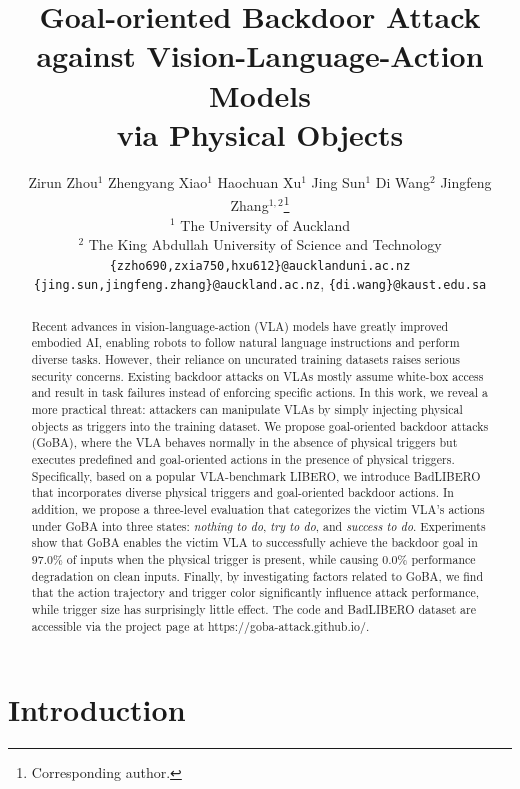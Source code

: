 \documentclass{article} %
\title{Goal-oriented Backdoor Attack \\against Vision-Language-Action Models \\via Physical Objects}
\author{
Zirun Zhou$^{1}$  Zhengyang Xiao$^{1}$  Haochuan Xu$^{1}$  Jing Sun$^{1}$  Di Wang$^{2}$  Jingfeng Zhang$^{1,2}$\thanks{Corresponding author.} \\
$^{1}$ The University of Auckland \\
$^{2}$ The King Abdullah University of Science and Technology \\
\texttt{\{zzho690,zxia750,hxu612\}@aucklanduni.ac.nz} \\ 
\texttt{\{jing.sun,jingfeng.zhang\}@auckland.ac.nz}, \texttt{\{di.wang\}@kaust.edu.sa} 
}
\begin{document}
\maketitle

\begin{abstract}
    Recent advances in vision-language-action (VLA) models have greatly improved embodied AI, enabling robots to follow natural language instructions and perform diverse tasks. However, their reliance on uncurated training datasets raises serious security concerns. Existing backdoor attacks on VLAs mostly assume white-box access and result in task failures instead of enforcing specific actions. In this work, we reveal a more practical threat: attackers can manipulate VLAs by simply injecting physical objects as triggers into the training dataset. We propose goal-oriented backdoor attacks (GoBA), where the VLA behaves normally in the absence of physical triggers but executes predefined and goal-oriented actions in the presence of physical triggers. Specifically, based on a popular VLA-benchmark LIBERO, we introduce BadLIBERO that incorporates diverse physical triggers and goal-oriented backdoor actions. In addition, we propose a three-level evaluation that categorizes the victim VLA’s actions under GoBA into three states: \textit{nothing to do}, \textit{try to do}, and \textit{success to do}. Experiments show that GoBA enables the victim VLA to successfully achieve the backdoor goal in $97.0\%$ of inputs when the physical trigger is present, while causing $0.0\%$ performance degradation on clean inputs. Finally, by investigating factors related to GoBA, we find that the action trajectory and trigger color significantly influence attack performance, while trigger size has surprisingly little effect. The code and BadLIBERO dataset are accessible via the project page at https://goba-attack.github.io/.
    
\end{abstract}


\section{Introduction}
\end{document}
